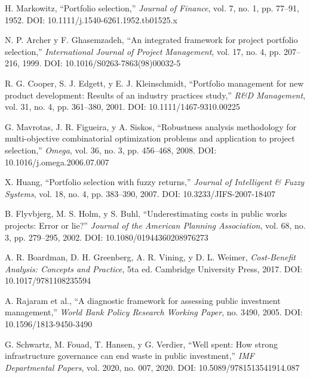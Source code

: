\documentclass[12pt,a4paper]{article}
\begin{document}
\begin{thebibliography}{45}

H. Markowitz, ``Portfolio selection,'' \textit{Journal of Finance}, vol. 7, no. 1, pp. 77--91, 1952. DOI: 10.1111/j.1540-6261.1952.tb01525.x

N. P. Archer y F. Ghasemzadeh, ``An integrated framework for project portfolio selection,'' \textit{International Journal of Project Management}, vol. 17, no. 4, pp. 207--216, 1999. DOI: 10.1016/S0263-7863(98)00032-5

R. G. Cooper, S. J. Edgett, y E. J. Kleinschmidt, ``Portfolio management for new product development: Results of an industry practices study,'' \textit{R\&D Management}, vol. 31, no. 4, pp. 361--380, 2001. DOI: 10.1111/1467-9310.00225

G. Mavrotas, J. R. Figueira, y A. Siskos, ``Robustness analysis methodology for multi-objective combinatorial optimization problems and application to project selection,'' \textit{Omega}, vol. 36, no. 3, pp. 456--468, 2008. DOI: 10.1016/j.omega.2006.07.007

X. Huang, ``Portfolio selection with fuzzy returns,'' \textit{Journal of Intelligent \& Fuzzy Systems}, vol. 18, no. 4, pp. 383--390, 2007. DOI: 10.3233/JIFS-2007-18407

B. Flyvbjerg, M. S. Holm, y S. Buhl, ``Underestimating costs in public works projects: Error or lie?'' \textit{Journal of the American Planning Association}, vol. 68, no. 3, pp. 279--295, 2002. DOI: 10.1080/01944360208976273

A. R. Boardman, D. H. Greenberg, A. R. Vining, y D. L. Weimer, \textit{Cost-Benefit Analysis: Concepts and Practice}, 5ta ed. Cambridge University Press, 2017. DOI: 10.1017/9781108235594

A. Rajaram et al., ``A diagnostic framework for assessing public investment management,'' \textit{World Bank Policy Research Working Paper}, no. 3490, 2005. DOI: 10.1596/1813-9450-3490

G. Schwartz, M. Fouad, T. Hansen, y G. Verdier, ``Well spent: How strong infrastructure governance can end waste in public investment,'' \textit{IMF Departmental Papers}, vol. 2020, no. 007, 2020. DOI: 10.5089/9781513541914.087


\end{thebibliography}
\end{document}
